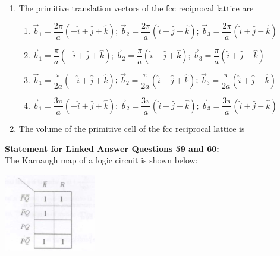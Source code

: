\documentclass[14pt, a4paper]{extarticle}
\begin{document}
\begin{enumerate}[label=\textbf{Q. \arabic*}, start=57]

\item The primitive translation vectors of the fcc reciprocal lattice are
\begin{enumerate}[label=(\Alph*)]
\item $\vec{b}_1 = \dfrac{2\pi}{a}(-\hat{i}+\hat{j}+\hat{k})$; $\vec{b}_2 = \dfrac{2\pi}{a}(\hat{i}-\hat{j}+\hat{k})$; $\vec{b}_3 = \dfrac{2\pi}{a}(\hat{i}+\hat{j}-\hat{k})$
\item $\vec{b}_1 = \dfrac{\pi}{a}(-\hat{i}+\hat{j}+\hat{k})$; $\vec{b}_2 = \dfrac{\pi}{a}(\hat{i}-\hat{j}+\hat{k})$; $\vec{b}_3 = \dfrac{\pi}{a}(\hat{i}+\hat{j}-\hat{k})$
\item $\vec{b}_1 = \dfrac{\pi}{2a}(-\hat{i}+\hat{j}+\hat{k})$; $\vec{b}_2 = \dfrac{\pi}{2a}(\hat{i}-\hat{j}+\hat{k})$; $\vec{b}_3 = \dfrac{\pi}{2a}(\hat{i}+\hat{j}-\hat{k})$
\item $\vec{b}_1 = \dfrac{3\pi}{a}(-\hat{i}+\hat{j}+\hat{k})$; $\vec{b}_2 = \dfrac{3\pi}{a}(\hat{i}-\hat{j}+\hat{k})$; $\vec{b}_3 = \dfrac{3\pi}{a}(\hat{i}+\hat{j}-\hat{k})$
\end{enumerate}

\item The volume of the primitive cell of the fcc reciprocal lattice is
\begin{enumerate}[label=(\Alph*)]
\end{enumerate}

\end{enumerate}

\vspace{1.5em}
\noindent
\textbf{Statement for Linked Answer Questions 59 and 60:} \\
The Karnaugh map of a logic circuit is shown below:
    \begin{center}
        \includegraphics[width=0.3\textwidth]{figs/Q59-60fig.png}
    \end{center}
\end{document}

